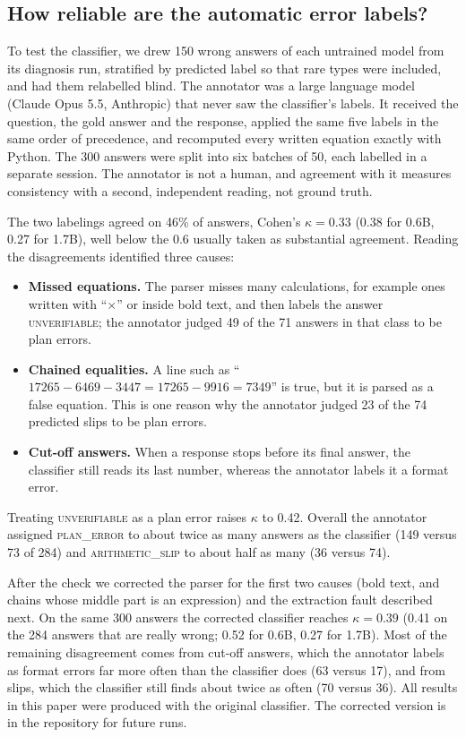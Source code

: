 \documentclass[11pt]{article}
\begin{document}
\subsection{How reliable are the automatic error labels?}
\label{sec:labelcheck}
To test the classifier, we drew 150 wrong answers of each untrained model from its diagnosis run, stratified by
predicted label so that rare types were included, and had them relabelled blind. The annotator was a large language
model (Claude Opus 5.5, Anthropic) that never saw the classifier's labels. It received the question, the gold answer and
the response, applied the same five labels in the same order of precedence, and recomputed every written equation
exactly with Python. The 300 answers were split into six batches of 50, each labelled in a separate session. The
annotator is not a human, and agreement with it measures consistency with a second, independent reading, not ground
truth.

The two labelings agreed on 46\% of answers, Cohen's $\kappa = 0.33$ (0.38 for 0.6B, 0.27 for 1.7B), well below the
0.6 usually taken as substantial agreement. Reading the disagreements identified three causes:
\begin{itemize}
  \item \textbf{Missed equations.} The parser misses many calculations, for example ones written with ``$\times$'' or
  inside bold text, and then labels the answer \textsc{unverifiable}; the annotator judged 49 of the 71 answers in that class to be
  plan errors.
  \item \textbf{Chained equalities.} A line such as ``$17265 - 6469 - 3447 = 17265 - 9916 = 7349$'' is true, but it is
  parsed as a false equation. This is one reason why the annotator judged 23 of the 74 predicted slips to be plan
  errors.
  \item \textbf{Cut-off answers.} When a response stops before its final answer, the classifier still reads its last
  number, whereas the annotator labels it a format error.
\end{itemize}
Treating \textsc{unverifiable} as a plan error raises $\kappa$ to 0.42. Overall the annotator assigned
\textsc{plan\_error} to about twice as many answers as the classifier (149 versus 73 of 284) and
\textsc{arithmetic\_slip} to about half as many (36 versus 74).

After the check we corrected the parser for the first two causes (bold text, and chains whose middle part is an
expression) and the extraction fault described next. On the same 300 answers the corrected classifier reaches
$\kappa = 0.39$ (0.41 on the 284 answers that are really wrong; 0.52 for 0.6B, 0.27 for 1.7B). Most of the remaining
disagreement comes from cut-off answers, which the annotator labels as format errors far more often than the classifier
does (63 versus 17), and from slips, which the classifier still finds about twice as often (70 versus 36). All results
in this paper were produced with the original classifier. The corrected version is in the repository for future runs.
\end{document}
